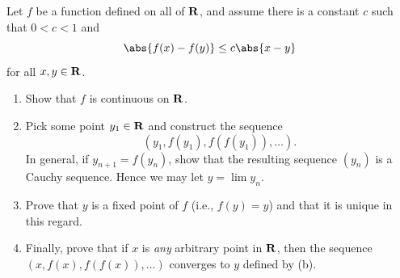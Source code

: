 \documentclass{lew98_solutions}
\begin{document}
\begin{exercise}
\label{ex:4.3.11}
    Let \( f \) be a function defined on all of \( \mathbf{R} \), and assume there is a constant \( c \) such that \( 0 < c < 1 \) and
    \[
        \abs{f(x) - f(y)} \leq c \abs{x - y}
    \]
    for all \( x, y \in \mathbf{R} \).
    \begin{enumerate}
        \item Show that \( f \) is continuous on \( \mathbf{R} \).

        \item Pick some point \( y_1 \in \mathbf{R} \) and construct the sequence
        \[
            (y_1, f(y_1), f(f(y_1)), \ldots).
        \]
        In general, if \( y_{n+1} = f(y_n) \), show that the resulting sequence \( (y_n) \) is a Cauchy sequence. Hence we may let \( y = \lim y_n \).

        \item Prove that \( y \) is a fixed point of \( f \) (i.e., \( f(y) = y \)) and that it is unique in this regard.

        \item Finally, prove that if \( x \) is \textit{any} arbitrary point in \( \mathbf{R} \), then the sequence \( (x, f(x), f(f(x)), \ldots) \) converges to \( y \) defined by (b).
    \end{enumerate}
\end{exercise}
\end{document}
